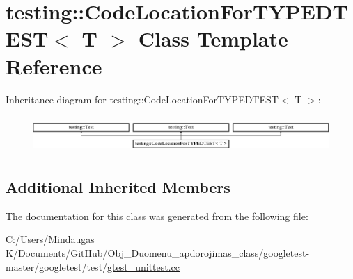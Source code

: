 \hypertarget{classtesting_1_1_code_location_for_t_y_p_e_d_t_e_s_t}{}\section{testing\+::Code\+Location\+For\+T\+Y\+P\+E\+D\+T\+E\+ST$<$ T $>$ Class Template Reference}
\label{classtesting_1_1_code_location_for_t_y_p_e_d_t_e_s_t}
Inheritance diagram for testing\+::Code\+Location\+For\+T\+Y\+P\+E\+D\+T\+E\+ST$<$ T $>$\+:\begin{figure}[H]
\begin{center}
\leavevmode
\includegraphics[height=1.424936cm]{d1/d86/classtesting_1_1_code_location_for_t_y_p_e_d_t_e_s_t}
\end{center}
\end{figure}
\subsection*{Additional Inherited Members}


The documentation for this class was generated from the following file\+:\begin{DoxyCompactItemize}
\item 
C\+:/\+Users/\+Mindaugas K/\+Documents/\+Git\+Hub/\+Obj\+\_\+\+Duomenu\+\_\+apdorojimas\+\_\+class/googletest-\/master/googletest/test/\mbox{\hyperlink{googletest-master_2googletest_2test_2gtest__unittest_8cc}{gtest\+\_\+unittest.\+cc}}\end{DoxyCompactItemize}
